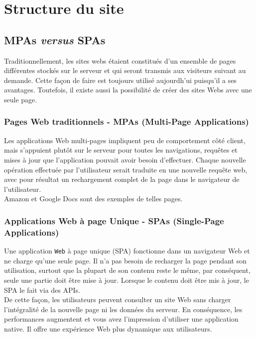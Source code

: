 \chapter{Structure du site}
\section{MPAs \textit{versus} SPAs \cite{ArchitectureWebApp}}
Traditionnellement, les sites webs \'etaient constitu\'es d'un ensemble de pages diff\'erentes stock\'es sur le serveur et qui seront transmis aux visiteurs suivant au demande. Cette fa\c{c}on de faire est toujours utilis\'e aujourdh'ui puisqu'il a ses avantages. Toutefois, il existe aussi la possibilit\'e de cr\'eer des sites Webs avec une seule page. 


\subsection{Pages Web traditionnels - MPAs (Multi-Page Applications)}
Les applications Web multi-pages impliquent peu de comportement c\^ot\'e client, mais s'appuient plut\^ot sur le serveur pour toutes les navigations, requ\^etes et mises \`a jour que l'application pouvait avoir besoin d'effectuer. Chaque nouvelle op\'eration effectu\'ee par l'utilisateur serait traduite en une nouvelle requ\^ete web, avec pour r\'esultat un rechargement complet de la page dans le navigateur de l'utilisateur. \\

Amazon et Google Docs sont des exemples de telles pages.

\subsection{Applications Web \`a page Unique - SPAs (Single-Page Applications)}
Une application \texttt{Web} \`a page unique (SPA) fonctionne dans un navigateur Web et ne charge qu'une seule page. Il n'a pas besoin de recharger la page pendant son utilisation, surtout que la plupart de son contenu reste le m\^eme, par cons\'equent, seule une partie doit \^etre mise \`a jour. Lorsque le contenu doit \^etre mis \`a jour, le SPA le fait via des APIs.\\
De cette façon, les utilisateurs peuvent consulter un site Web sans charger l'int\'egralit\'e de la nouvelle page ni les donn\'ees du serveur. En cons\'equence, les performances augmentent et vous avez l'impression d'utiliser une application native. Il offre une exp\'erience Web plus dynamique aux utilisateurs. \\

